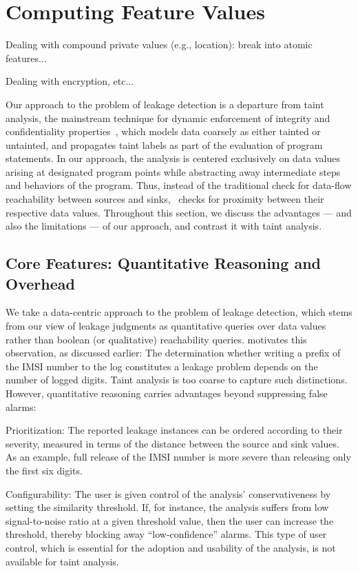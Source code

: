 \section{Computing Feature Values}\label{Se:analysis}


Dealing with compound private values (e.g., location): break into atomic features...

Dealing with encryption, etc... 

Our approach to the problem of leakage detection is a departure from taint analysis, the mainstream technique for dynamic enforcement of integrity and confidentiality properties~\cite{ME:PLDI08,CLO:ISSTA07,CSL:CCS08,NS:NDSS05}, which models data coarsely as either tainted or untainted, and propagates taint labels as part of the evaluation of program statements. In our approach, the analysis is centered exclusively on data values arising at designated program points while abstracting away intermediate steps and behaviors of the program. Thus, instead of the traditional check for data-flow reachability between sources and sinks, \Tool\ checks for proximity between their respective data values. Throughout this section, we discuss the advantages --- and also the limitations --- of our approach, and contrast it with taint analysis.

\subsection{Core Features: Quantitative Reasoning and Overhead}

We take a data-centric approach to the problem of leakage detection, which stems from our view of leakage judgments as quantitative queries over data values rather than boolean (or qualitative) reachability queries.  motivates this observation, as discussed earlier: The determination whether writing a prefix of the IMSI number to the log constitutes a leakage problem depends on the number of logged digits. Taint analysis is too coarse to capture such distinctions. However, quantitative reasoning carries advantages beyond suppressing false alarms:
\begin{compactitem}
	\item Prioritization: The reported leakage instances can be ordered according to their severity, measured in terms of the distance between the source and sink values. As an example, full release of the IMSI number is more severe than 
	releasing only the first six digits.
	\item Configurability: The user is given control of the analysis' conservativeness by setting the similarity threshold. If, for instance, the analysis suffers from low signal-to-noise ratio at a given threshold value, then the user can increase the 
	threshold, thereby blocking away ``low-confidence'' alarms. This type of user control, which is essential for the adoption and usability of the analysis, is not available for taint analysis.
\end{compactitem} 


